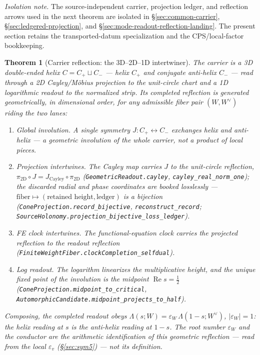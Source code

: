 \documentclass[11pt]{article}
\newtheorem{theorem}{Theorem}
\theoremstyle{definition}
\renewcommand{\Re}{\operatorname{Re}}
\begin{document}
\noindent\emph{Isolation note.} The source-independent carrier, projection
ledger, and reflection arrows used in the next theorem are isolated in
\S\ref{sec:common-carrier}, \S\ref{sec:ledgered-projection}, and
\S\ref{sec:mode-readout-reflection-landing}.  The present section retains the
transported-datum specialization and the CPS/local-factor bookkeeping.

\begin{theorem}[Carrier reflection: the 3D--2D--1D intertwiner]\label{thm:carrierreflection}
The carrier is a 3D double-ended helix $C=C_+\sqcup C_-$ --- helix $C_+$ and conjugate anti-helix $C_-$ ---
read through a 2D Cayley/M\"obius projection to the unit-circle chart and a 1D logarithmic readout to the
normalized strip. Its completed reflection is generated \emph{geometrically}, in dimensional order, for any
admissible fiber pair $(W,W^\vee)$ riding the two lanes:
\begin{enumerate}
\item[\textup{(J)}] \emph{Global involution.} A single symmetry $J\colon C_+\leftrightarrow C_-$ exchanges helix
and anti-helix --- a geometric involution of the \emph{whole} carrier, not a product of local pieces.
\item[\textup{(P)}] \emph{Projection intertwines.} The Cayley map carries $J$ to the unit-circle reflection,
$\pi_{2\mathrm D}\!\circ J=J_{\mathrm{Cayley}}\!\circ\pi_{2\mathrm D}$ (\texttt{GeometricReadout.cayley},
\texttt{cayley\_real\_norm\_one}); the discarded radial and phase coordinates are booked \emph{losslessly} ---
$\text{fiber}\mapsto(\text{retained height},\text{ledger})$ is a bijection
(\texttt{ConeProjection.record\_bijective}, \texttt{reconstruct\_record};
\texttt{SourceHolonomy.projection\_bijective\_loss\_ledger}).
\item[\textup{(C)}] \emph{FE clock intertwines.} The functional-equation clock carries the projected reflection
to the readout reflection (\texttt{FiniteWeightFiber.clockCompletion\_selfdual}).
\item[\textup{(L)}] \emph{Log readout.} The logarithm linearizes the multiplicative height, and the unique
fixed point of the involution is the midpoint $\Re s=\tfrac12$ (\texttt{ConeProjection.midpoint\_to\_critical},
\texttt{AutomorphicCandidate.midpoint\_projects\_to\_half}).
\end{enumerate}
Composing, the completed readout obeys $\Lambda(s;W)=\varepsilon_W\,\Lambda(1-s;W^\vee)$, $|\varepsilon_W|=1$:
the helix reading at $s$ is the anti-helix reading at $1-s$. The root number $\varepsilon_W$ and the conductor
are the \emph{arithmetic identification} of this geometric reflection --- read from the local $\varepsilon_v$
(\S\ref{sec:sym5}) --- not its definition.
\end{theorem}
\end{document}
